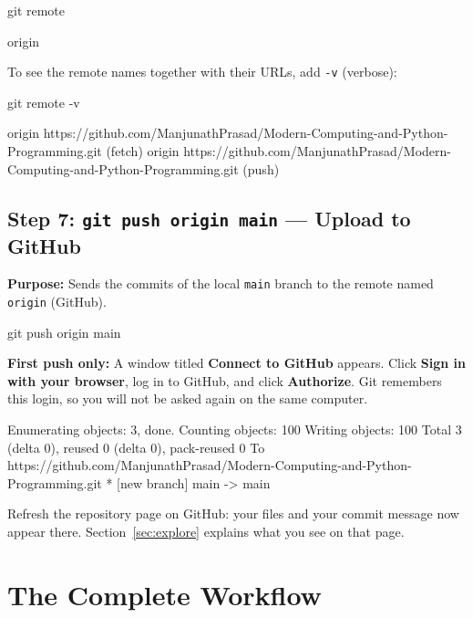 \documentclass[11pt,a4paper]{article}
\newcommand{\code}[1]{\texttt{#1}}
\newcommand{\menu}[1]{\textsf{\textbf{#1}}}
\begin{document}
\begin{cmd}
git remote
\end{cmd}
\begin{outbox}
origin
\end{outbox}

To see the remote names together with their URLs, add \code{-v} (verbose):

\begin{cmd}
git remote -v
\end{cmd}
\begin{outbox}
origin  https://github.com/ManjunathPrasad/Modern-Computing-and-Python-Programming.git (fetch)
origin  https://github.com/ManjunathPrasad/Modern-Computing-and-Python-Programming.git (push)
\end{outbox}

\subsection{Step 7: \code{git push origin main} --- Upload to GitHub}

\textbf{Purpose:} Sends the commits of the local \code{main} branch to the remote named \code{origin} (GitHub).

\begin{cmd}
git push origin main
\end{cmd}

\textbf{First push only:} A window titled \textbf{Connect to GitHub} appears. Click \menu{Sign in with your browser}, log in to GitHub, and click \menu{Authorize}. Git remembers this login, so you will not be asked again on the same computer.

\begin{outbox}
Enumerating objects: 3, done.
Counting objects: 100%
Writing objects: 100%
Total 3 (delta 0), reused 0 (delta 0), pack-reused 0
To https://github.com/ManjunathPrasad/Modern-Computing-and-Python-Programming.git
 * [new branch]      main -> main
\end{outbox}

Refresh the repository page on GitHub: your files and your commit message now appear there. Section~\ref{sec:explore} explains what you see on that page.

\section{The Complete Workflow}
\end{document}
